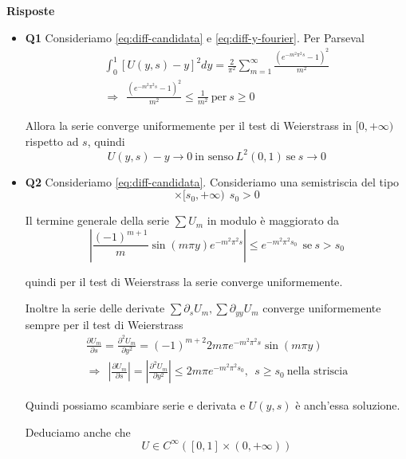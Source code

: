 \documentclass[10pt,a4paper,twoside,openright]{book}
\begin{document}
\textbf{Risposte}
\begin{itemize} %
\item \textbf{Q1} Consideriamo \eqref{eq:diff-candidata} e \eqref{eq:diff-y-fourier}. Per Parseval\begin{gather*}
\int ^{1}_{0}[ U(y,s) -y]^{2} dy=\frac{2}{\pi ^{2}}\sum\limits ^{\infty }_{m=1}\frac{\left( e^{-m^{2} \pi ^{2} s} -1\right)^{2}}{m^{2}}\\
\Rightarrow \ \ \frac{\left( e^{-m^{2} \pi ^{2} s} -1\right)^{2}}{m^{2}} \leqslant \frac{1}{m^{2}} \ \text{per} \ s\geqslant 0
\end{gather*}

Allora la serie converge uniformemente per il test di Weierstrass in $[ 0,+\infty)$ rispetto ad $s$, quindi\begin{equation*}
U(y,s) -y\rightarrow 0\ \text{in senso} \ L^{2}(0,1) \ \text{se} \ s\rightarrow 0
\end{equation*}
\item \textbf{Q2} Consideriamo \eqref{eq:diff-candidata}. Consideriamo una semistriscia del tipo\begin{equation*}
[ 0,1] \times [ s_{0},+\infty) \ \ s_{0}  >0
\end{equation*}

Il termine generale della serie $\sum U_{m}$ in modulo è maggiorato da\begin{equation*}
\left| \frac{(-1)^{m+1}}{m}\sin(m\pi y) e^{-m^{2} \pi ^{2} s}\right| \leqslant e^{-m^{2} \pi ^{2} s_{0}} \ \ \text{se} \ s >s_{0}
\end{equation*}

quindi per il test di Weierstrass la serie converge uniformemente.

Inoltre la serie delle derivate $\sum \partial _{s} U_{m},\sum \partial _{yy} U_{m}$ converge uniformemente sempre per il test di Weierstrass\begin{gather*}
\frac{\partial U_{m}}{\partial s} =\frac{\partial ^{2} U_{m}}{\partial y^{2}} =(-1)^{m+2} 2m\pi e^{-m^{2} \pi ^{2} s}\sin(m\pi y)\\
\Rightarrow \ \ \left| \frac{\partial U_{m}}{\partial s}\right| =\left| \frac{\partial ^{2} U_{m}}{\partial y^{2}}\right| \leqslant 2m \pi e^{-m^{2} \pi ^{2} s_{0}},\ \ s\geqslant s_{0} \ \text{nella striscia}
\end{gather*}

Quindi possiamo scambiare serie e derivata e $U(y,s)$ è anch'essa soluzione.

Deduciamo anche che\begin{equation*}
U\in C^{\infty }([ 0,1] \times (0,+\infty))
\end{equation*}


\end{itemize}
\end{document}
